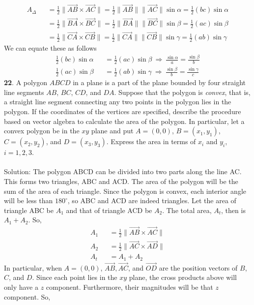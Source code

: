 \documentclass[12pt]{amsbook}
\begin{document}
\begin{eqnarray*}
A_\Delta&&=\frac 12\|\overrightarrow{AB}\times\overrightarrow{AC}\|=\frac 12\|\overrightarrow{AB}\|\|\overrightarrow{AC}\|\sin\alpha=\frac 12(bc)\sin\alpha\\
&&=\frac 12\|\overrightarrow{BA}\times\overrightarrow{BC}\|=\frac 12\|\overrightarrow{BA}\|\|\overrightarrow{BC}\|\sin\beta=\frac 12(ac)\sin\beta\\
&&=\frac 12\|\overrightarrow{CA}\times\overrightarrow{CB}\|=\frac 12\|\overrightarrow{CA}\|\|\overrightarrow{CB}\|\sin\gamma=\frac 12(ab)\sin\gamma
\end{eqnarray*}
We can equate these as follows
\begin{eqnarray*}
\frac 12(bc)\sin\alpha&&=\frac 12(ac)\sin\beta \ \Rightarrow \ \frac{\sin\alpha}{a}=\frac{\sin\beta}{b} \\
\frac 12(ac)\sin\beta&&=\frac 12(ab)\sin\gamma\ \Rightarrow \ \frac{\sin\beta}{b}=\frac{\sin\gamma}{c} 
\end{eqnarray*}
{\small\bf 22}. 
A polygon $ABCD$ in a plane is a part of the plane bounded by
 four straight line segments $AB$, $BC$, $CD$, and
$DA$. Suppose that the polygon is {\em convex}, that is, a straight line
segment connecting any two points in the polygon lies in the polygon.
If the coordinates of the vertices are specified, describe
the procedure based on vector algebra to calculate the area of the
polygon. In particular, let a convex polygon be in the $xy$ plane
and put $A=(0,0)$, $B=(x_1,y_1)$,
$C=(x_2,y_2)$, and $D=(x_3,y_3)$. Express the area in terms of $x_i$
and $y_i$, $i=1,2,3$.\\
\\
{\sc Solution}: The polygon ABCD can be divided into two parts along the line AC. This forms two triangles, ABC and ACD. The area of the polygon will be the sum of the area of each triangle. Since the polygon is convex, each interior angle will be less than $180^\circ$, so ABC and ACD are indeed triangles. Let the area of triangle ABC be $A_1$ and that of triangle ACD be $A_2$. The total area, $A_t$, then is $A_1+A_2$. So,
\begin{eqnarray*}
A_1&&=\frac 12\|\overrightarrow{AB}\times\overrightarrow{AC}\| \\
A_2&&=\frac 12\|\overrightarrow{AC}\times\overrightarrow{AD}\| \\
A_t&&=A_1+A_2
\end{eqnarray*}
In particular, when $A=(0,0)$, $\overrightarrow{AB}, \overrightarrow{AC}$, and $\overrightarrow{OD}$ are the position vectors of $B$, $C$, and $D$. Since each point lies in the $xy$ plane, the cross products above will only have a $z$ component. Furthermore, their magnitudes will be that $z$ component. So,
\end{document}
